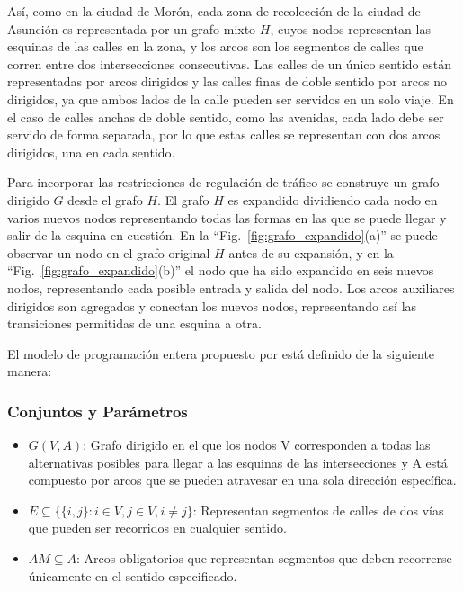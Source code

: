 \documentclass[spanish, conference]{IEEEtran}
\begin{document}
{Así, como en la ciudad de Morón, cada zona de recolección de la ciudad de Asunción es representada por un grafo mixto $H$, cuyos nodos representan las esquinas de las calles en la zona, y los arcos son los segmentos de calles que corren entre dos intersecciones consecutivas. Las calles de un único sentido están representadas por arcos dirigidos y las calles finas de doble sentido por arcos no dirigidos, ya que ambos lados de la calle pueden ser servidos en un solo viaje. En el caso de calles anchas de doble sentido, como las avenidas, cada lado debe ser servido de forma separada, por lo que estas calles se representan con dos arcos dirigidos, una en cada sentido.

Para incorporar las restricciones de regulación de tráfico se construye un grafo dirigido $G$ desde el grafo $H$. El grafo $H$ es expandido dividiendo cada nodo en varios nuevos nodos representando todas las formas en las que se puede llegar y salir de la esquina en cuestión. En la ``Fig.~\ref{fig:grafo_expandido}(a)'' se puede observar un nodo en el grafo original $H$ antes de su expansión, y en la ``Fig.~\ref{fig:grafo_expandido}(b)'' el nodo que ha sido expandido en seis nuevos nodos, representando cada posible entrada y salida del nodo. Los arcos auxiliares dirigidos son agregados y conectan los nuevos nodos, representando así las transiciones permitidas de una esquina a otra. 

El modelo de programación entera propuesto por \cite{Braier2017AnArgentina} está definido de la siguiente manera:

\subsubsection{Conjuntos y Parámetros}

\begin{itemize}
\item $G(V, A)$: Grafo dirigido en el que los nodos V corresponden a todas las alternativas posibles para llegar a las esquinas de las intersecciones y A está compuesto por arcos que se pueden atravesar en una sola dirección específica.

\item $E \subseteq \{ \{i, j\}: i \in V, j \in V, i \neq j\}$: Representan segmentos de calles de dos vías que pueden ser recorridos en cualquier sentido.

\item $AM \subseteq A $: Arcos obligatorios que representan segmentos que deben recorrerse únicamente en el sentido especificado.


\end{itemize}}
\end{document}
